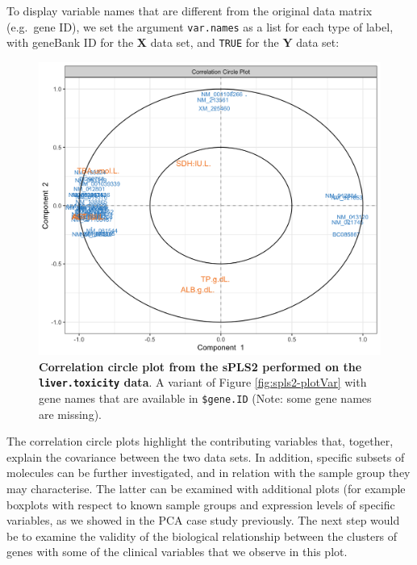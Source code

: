 \documentclass[]{book}
\newenvironment{Shaded}{\begin{snugshade}}{\end{snugshade}}
\newcommand{\KeywordTok}[1]{\textcolor[rgb]{0.13,0.29,0.53}{\textbf{#1}}}
\newcommand{\DataTypeTok}[1]{\textcolor[rgb]{0.13,0.29,0.53}{#1}}
\newcommand{\DecValTok}[1]{\textcolor[rgb]{0.00,0.00,0.81}{#1}}
\newcommand{\StringTok}[1]{\textcolor[rgb]{0.31,0.60,0.02}{#1}}
\newcommand{\OtherTok}[1]{\textcolor[rgb]{0.56,0.35,0.01}{#1}}
\newcommand{\OperatorTok}[1]{\textcolor[rgb]{0.81,0.36,0.00}{\textbf{#1}}}
\newcommand{\NormalTok}[1]{#1}
\begin{document}
To display variable names that are different from the original data
matrix (e.g.~gene ID), we set the argument \texttt{var.names} as a list
for each type of label, with geneBank ID for the \(\boldsymbol X\) data
set, and \texttt{TRUE} for the \(\boldsymbol Y\) data set:

\begin{Shaded}
\end{Shaded}

\begin{figure}

{\centering \includegraphics[width=0.5\linewidth]{Figures/PLS/spls2-plotVar2-1} 

}

\caption{\textbf{Correlation circle plot from the sPLS2
performed on the \texttt{liver.toxicity} data}. A variant of Figure
\ref{fig:spls2-plotVar} with gene names that are available in
\texttt{\$gene.ID} (Note: some gene names are missing).}\label{fig:spls2-plotVar2}
\end{figure}






The correlation circle plots highlight the contributing variables that,
together, explain the covariance between the two data sets. In addition,
specific subsets of molecules can be further investigated, and in
relation with the sample group they may characterise. The latter can be
examined with additional plots (for example boxplots with respect to
known sample groups and expression levels of specific variables, as we
showed in the PCA case study previously. The next step would be to
examine the validity of the biological relationship between the clusters
of genes with some of the clinical variables that we observe in this
plot.
\end{document}
